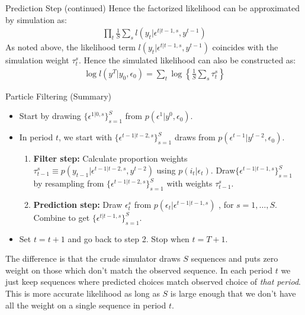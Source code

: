 \begin{frame}{Prediction Step (continued)}
Hence the factorized likelihood can be approximated by simulation as:
\begin{eqnarray*}
\prod_t \frac{1}{S} \sum_s l (y_t | \epsilon^{t|t-1,s},y^{t-1})
\end{eqnarray*}
As noted above, the likelihood term $l(y_t | \epsilon^{t | t-1,s},y^{t-1})$ coincides with the simulation weight $\tau_t^s$. Hence the simulated likelihood can also be constructed as:
\begin{eqnarray*}
\log l (y^T | y_0, \epsilon_0) = \sum_t \log \left\{ \frac{1}{S} \sum_s \tau_t^s \right\}
\end{eqnarray*}
\end{frame}

\begin{frame}{Particle Filtering (Summary)}
\begin{itemize}
\item Start by drawing $\{ \epsilon^{1|0,s}\}_{s=1}^S$ from $p(\epsilon^1 | y^0, \epsilon_0)$.
\item In period $t$, we start with $\{ \epsilon^{t-1|t-2,s}\}_{s=1}^S$ draws from $p(\epsilon^{t-1} | y^{t-2},\epsilon_0)$.
\begin{enumerate}
\item \textbf{Filter step:} Calculate proportion weights $\tau_{t-1}^s \equiv p(y_{t-1} | \epsilon^{t-1 | t-2,s}, y^{t-2}) $ using $p(i_t | \epsilon_t)$. Draw$\{\epsilon^{t-1 | t-1,s}\}_{s=1}^S$ by resampling from $\{ \epsilon^{t-1|t-2,s}\}_{s=1}^S$ with weights $\tau_{t-1}^s$.
\item \textbf{Prediction step:} Draw $\epsilon_t^s$ from $p(\epsilon_t | \epsilon^{t-1 | t-1,s})$ , for $s=1,\ldots,S$. Combine to get 
$\{ \epsilon^{t | t-1,s} \}_{s=1}^S$.
\end{enumerate}
\item Set $t=t+1$ and go back to step 2.  Stop when $t=T+1$.
\end{itemize}
The difference is that the crude simulator draws $S$ sequences and puts zero weight on those which don't match the observed sequence. In each period $t$ we just keep sequences where predicted choices match observed choice of \textit{that period}. This is more accurate likelihood as long as $S$ is large enough that we don't have all the weight on a single sequence in period $t$.
\end{frame}



